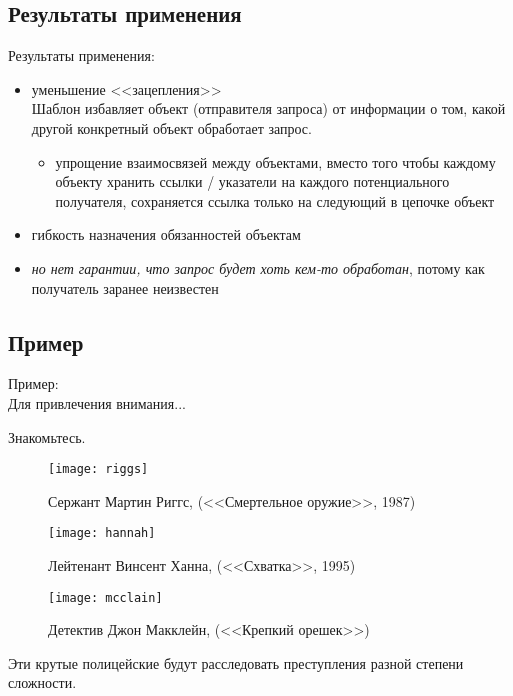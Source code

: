 \documentclass{beamer}
\begin{document}
\subsection{Результаты применения}
\begin{frame}
	Результаты применения: \pause
	\begin{itemize}
		\item уменьшение <<зацепления>> \\ \pause
			Шаблон избавляет объект (отправителя запроса) от информации о том,
		какой другой конкретный объект обработает запрос. \pause
		\begin{itemize}
			\item упрощение взаимосвязей между объектами, вместо того чтобы
			каждому объекту хранить ссылки / указатели на каждого
			потенциального получателя, сохраняется ссылка только на следующий в
			цепочке объект \pause
		\end{itemize}
		\item гибкость назначения обязанностей объектам \pause
		\item \emph{\color{red}но нет гарантии, что запрос будет хоть кем-то
			обработан}\pause, потому как получатель заранее неизвестен
	\end{itemize}
\end{frame}

\subsection{Пример}
\begin{frame}
	Пример: \pause \\
	Для привлечения внимания... \pause

	Знакомьтесь. \pause
	\begin{figure}[!htb]
	\texttt{[image: riggs]}
	\caption{Сержант Мартин Риггс, (<<Смертельное оружие>>, 1987)}
	\endminipage\hfill
	\pause
	\texttt{[image: hannah]}
	\caption{Лейтенант Винсент Ханна, (<<Схватка>>, 1995)}
	\endminipage\hfill
	\pause
	\texttt{[image: mcclain]}
	\caption{Детектив Джон Макклейн, (<<Крепкий орешек>>)}
	\endminipage
	\end{figure}
	\pause
	Эти крутые полицейские будут расследовать преступления разной степени
	сложности.
\end{frame}
\end{document}
